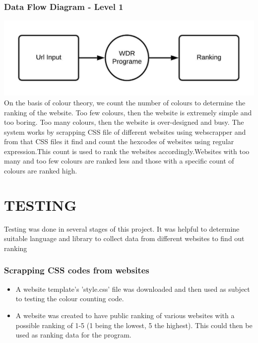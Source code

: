 \documentclass{fisatproject}
\begin{document}
\subsection{Data Flow Diagram - Level 1}
\includegraphics[scale=0.80]{image/level_0_dfd.jpeg}
\newpage
On the basis of colour theory, we count the number of
colours to determine the ranking of the website.
Too few colours, then the website is extremely simple and too
boring.
Too many colours, then the website is over-designed and busy.
The system works by scrapping CSS file of different websites using webscrapper and from that CSS files it find and count the hexcodes of websites using regular expression.This count is used to rank the websites accordingly.Websites with too many and too few colours are ranked less and those with a specific count of colours are ranked high.    
\chapter{TESTING}

	Testing was done in several stages of this project. It was helpful to determine suitable language and library to collect data from different websites to find out ranking\\
	\subsection{Scrapping CSS codes from websites}
\begin{itemize}
	\item A website template's 'style.css' file was downloaded and then used as subject to testing the colour counting code.
	\item A website was created to have public ranking of various websites with a possible ranking of 1-5 (1 being the lowest, 5 the highest). This could then be used as ranking data for the program.
\end{itemize}
\end{document}
